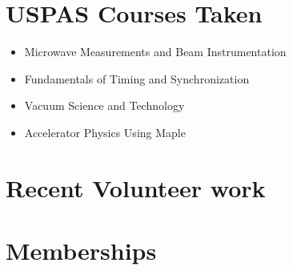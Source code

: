 \documentclass[11pt,a4paper,sans]{moderncv}        %
\begin{document}
\section{USPAS Courses Taken}
\begin{itemize}
	\item {Microwave Measurements and Beam Instrumentation}
	\item {Fundamentals of Timing and Synchronization}
	\item {Vacuum Science and Technology}
	\item {Accelerator Physics Using Maple}
\end{itemize}
\fi

\section{Recent Volunteer work}



\section{Memberships}

\iffalse
\section{References}
\begin{cvcolumns}
  \cvcolumn{Category 1}{\begin{itemize}\item Linda Spentzouris \item John Power \item Larry Pinsky \end{itemize}}
  \cvcolumn{Category 2}{Amongst others:\begin{itemize}\item Person 1, and\item Person 2\end{itemize}(more upon request)}
  \cvcolumn[0.5]{All the rest \& some more}{\textit{That} person, and \textbf{those} also (all available upon request).}
\end{cvcolumns}
\fi


\clearpage


\end{document}

